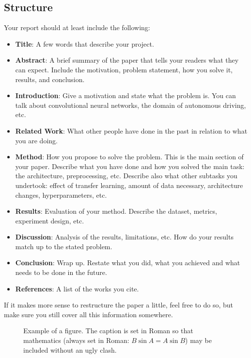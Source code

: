 \documentclass[10pt,twocolumn,letterpaper]{article}
\begin{document}
\subsection{Structure}
Your report should at least include the following:
\begin{itemize}
	\itemsep-0.4em 
	\item \textbf{Title}: A few words that describe your project.
	\item \textbf{Abstract}: A brief summary of the paper that tells your readers what they can expect. Include the motivation, problem statement, how you solve it, results, and conclusion.
	\item \textbf{Introduction}: Give a motivation and state what the problem is. You can talk about convolutional neural networks, the domain of autonomous driving, etc.
	\item \textbf{Related Work}: What other people have done in the past in relation to what you are doing.
	\item \textbf{Method}: How you propose to solve the problem. This is the main section of your paper. Describe what you have done and how you solved the main task: the architecture, preprocessing, etc. Describe also what other subtasks you undertook: effect of transfer learning, amount of data necessary, architecture changes, hyperparameters, etc.
	\item \textbf{Results}: Evaluation of your method. Describe the dataset, metrics, experiment design, etc.
	\item \textbf{Discussion}: Analysis of the results, limitations, etc. How do your results match up to the stated problem.
	\item \textbf{Conclusion}: Wrap up. Restate what you did, what you achieved and what needs to be done in the future. 
	\item \textbf{References}: A list of the works you cite.
\end{itemize}
If it makes more sense to restructure the paper a little, feel free to do so, but make sure you still cover all this information somewhere.

\begin{figure}[t]
	\begin{center}
		\fbox{\rule{0pt}{2in} \rule{0.9\linewidth}{0pt}}
	\end{center}
	\caption{Example of a figure. The caption is set in Roman so that mathematics
		(always set in Roman: $B \sin A = A \sin B$) may be included without an
		ugly clash.}
	\label{fig:long}
	\label{fig:onecol}
\end{figure}
\end{document}
